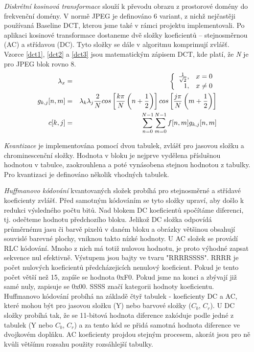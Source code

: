\documentclass[11pt,a4paper]{article}
\begin{document}
\textit{Diskrétní kosinová transformace} slouží k převodu obrazu z prostorové domény do frekvenční domény. V normě JPEG
je definováno 6 variant, z nichž nejčastěji používaná Baseline DCT, kterou jsme také v rámci projektu implementovali\cite{mul}. 
Po aplikaci kosinové transformace dostaneme dvě složky koeficientů -- stejnosměrnou (AC) a střídavou (DC). Tyto složky
se dále v algoritmu komprimují zvlášť. Vzorce \ref{dct1}, \ref{dct2} a \ref{dct3} jsou matematickým zápisem DCT,
kde platí, že \textit{N} je pro JPEG blok rovno 8.
\begin{eqnarray}
\lambda_x &=& \left\{ \begin{array}{r@{\quad}c}
    \frac{1}{\sqrt{2}}, & x = 0 \\
    1, & x \neq 0\\ 
\end{array} \right.\label{dct1}\\
g_{k,j}[n,m] &=& \lambda_k \lambda_j \frac{2}{N} cos\left[\frac{k \pi}{N}\left(n+\frac{1}{2}\right)\right] cos\left[\frac{j \pi}{N}\left(m+\frac{1}{2}\right)\right]\label{dct2}\\
c[k,j] &=& \sum^{N-1}_{n=0}{\sum^{N-1}_{m=0}{f[n,m]g_{k,j}[n,m]}}\label{dct3}
\end{eqnarray}


\textit{Kvantizace} je implementována pomocí dvou tabulek, zvlášť pro jasovou složku a chrominescenční složky. Hodnota v 
bloku je nejprve vydělena příslušnou hodnotou v tabulce, zaokrouhlena a poté vynásobena stejnou hodnotou z tabulky.
Pro kvantizaci je definováno několik vhodných tabulek\cite{t81}.

\textit{Huffmanovo kódování} kvantovaných složek probíhá pro stejnosměrné a střídavé koeficienty zvlášť. Před samotným kódováním se tyto složky upraví, aby došlo k redukci výsledného počtu bitů. Nad blokem DC koeficientů spočítáme diferenci, tj. odečteme hodnotu předchozího bloku. Jelikož DC složka odpovídá průměrnému jasu či barvě pixelů v daném bloku a obrázky většinou obsahují souvislé barevné plochy, vniknou takto nízké hodnoty\cite{root}. U AC složek se provádí RLC kódování. Mnoho z nich má totiž nulovou hodnotu, je proto výhodné zapsat sekvence nul efektivně. Výstupem jsou bajty ve tvaru "RRRRSSSS". RRRR je počet nulových koeficientů předcházejicích nenulový koeficient. Pokud je tento počet větší než 15, zapíše se hodnota 0xF0. Pokud jsme na konci a zbývají již samé nuly, zapisuje se 0x00. SSSS značí kategorii hodnoty koeficientu.
Huffmanovo kódování probíhá na základě čtyř tabulek - koeficienty DC a AC, které mohou být pro jasovou složku (Y) nebo barvové složky ($C_b$, $C_r$). U DC složky probíhá tak, že se 11-bitová hodnota diference zakóduje podle jedné z tabulek (Y nebo $C_b$, $C_r$) a za tento kód se přidá samotná hodnota diference ve dvojkovém doplňku. AC koeficienty projdou stejným procesem, akorát jsou pro ně kvůli většímu rozsahu použity rozsáhlejší tabulky.
\end{document}
